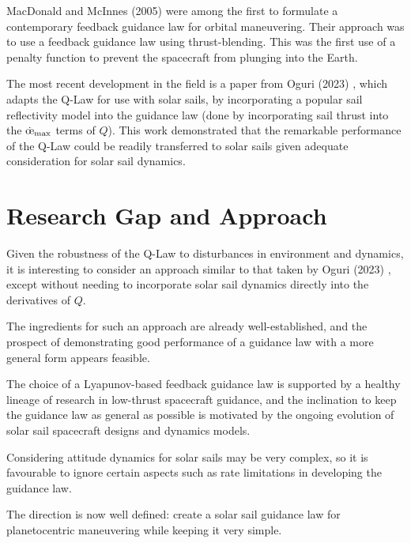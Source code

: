 MacDonald and McInnes (2005) \cite{macdonald2005analytical} were among the first to formulate a contemporary feedback guidance law for orbital maneuvering. Their approach was to use a feedback guidance law using thrust-blending. This was the first use of a penalty function to prevent the spacecraft from plunging into the Earth.

The most recent development in the field is a paper from Oguri (2023) \cite{oguri2023solar}, which adapts the Q-Law for use with solar sails, by incorporating a popular sail reflectivity model into the guidance law (done by incorporating sail thrust into the \(\dot{\moe}_{\max}\) terms of \(Q\)). This work demonstrated that the remarkable performance of the Q-Law could be readily transferred to solar sails given adequate consideration for solar sail dynamics.

\section{Research Gap and Approach}
Given the robustness of the Q-Law to disturbances in environment and dynamics, it is interesting to consider an approach similar to that taken by Oguri (2023) \cite{oguri2023solar}, except without needing to incorporate solar sail dynamics directly into the derivatives of \(Q\).

The ingredients for such an approach are already well-established, and the prospect of demonstrating good performance of a guidance law with a more general form appears feasible.

The choice of a Lyapunov-based feedback guidance law is supported by a healthy lineage of research in low-thrust spacecraft guidance, and the inclination to keep the guidance law as general as possible is motivated by the ongoing evolution of solar sail spacecraft designs and dynamics models.

Considering attitude dynamics for solar sails may be very complex, so it is favourable to ignore certain aspects such as rate limitations in developing the guidance law.

The direction is now well defined: create a solar sail guidance law for planetocentric maneuvering while keeping it very simple.